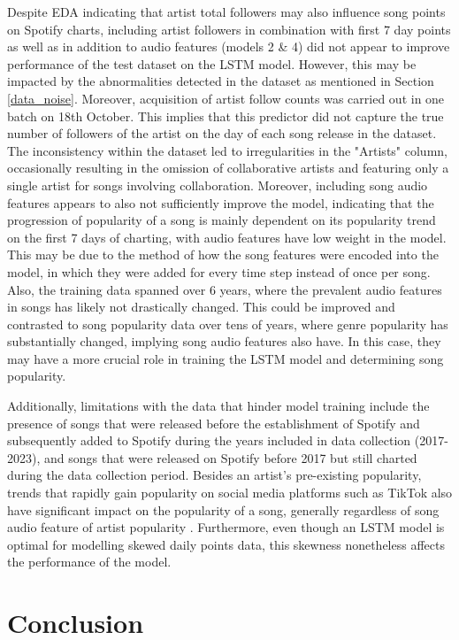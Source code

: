 \documentclass{article}
\begin{document}
Despite EDA indicating that artist total followers may also influence song points on Spotify charts, including artist followers in combination with first 7 day points as well as in addition to audio features (models 2 \& 4) did not appear to improve performance of the test dataset on the LSTM model. However, this may be impacted by the abnormalities detected in the dataset as mentioned in Section \ref{data_noise}. Moreover, acquisition of artist follow counts was carried out in one batch on 18th October. This implies that this predictor did not capture the true number of followers of the artist on the day of each song release in the dataset. The inconsistency within the dataset led to irregularities in the "Artists" column, occasionally resulting in the omission of collaborative artists and featuring only a single artist for songs involving collaboration. Moreover, including song audio features appears to also not sufficiently improve the model, indicating that the progression of popularity of a song is mainly dependent on its popularity trend on the first 7 days of charting, with audio features have low weight in the model. This may be due to the method of how the song features were encoded into the model, in which they were added for every time step instead of once per song. Also, the training data spanned over 6 years, where the prevalent audio features in songs has likely not drastically changed. This could be improved and contrasted to song popularity data over tens of years, where genre popularity has substantially changed, implying song audio features also have. In this case, they may have a more crucial role in training the LSTM model and determining song popularity.

Additionally, limitations with the data that hinder model training include the presence of songs that were released before the establishment of Spotify and subsequently added to Spotify during the years included in data collection (2017-2023), and songs that were released on Spotify before 2017 but still charted during the data collection period. Besides an artist's pre-existing popularity, trends that rapidly gain popularity on social media platforms such as TikTok also have significant impact on the popularity of a song, generally regardless of song audio feature of artist popularity \cite{TikTok}. Furthermore, even though an LSTM model is optimal for modelling skewed daily points data, this skewness nonetheless affects the performance of the model. 


\section{Conclusion}
\end{document}
